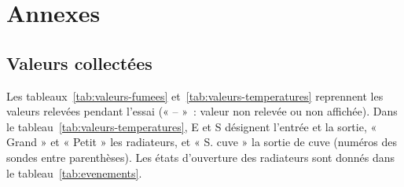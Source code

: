 \section{Annexes}
\label{sec:annexes}

\subsection{Valeurs collectées}
\label{subsec:valeurs}

Les tableaux~\ref{tab:valeurs-fumees} et~\ref{tab:valeurs-temperatures} reprennent les valeurs relevées pendant l'essai (« -- »~: valeur non relevée ou non affichée). Dans le tableau~\ref{tab:valeurs-temperatures}, E et S désignent l'entrée et la sortie, « Grand » et « Petit » les radiateurs, et « S. cuve » la sortie de cuve (numéros des sondes entre parenthèses). Les états d'ouverture des radiateurs sont donnés dans le tableau~\ref{tab:evenements}.

